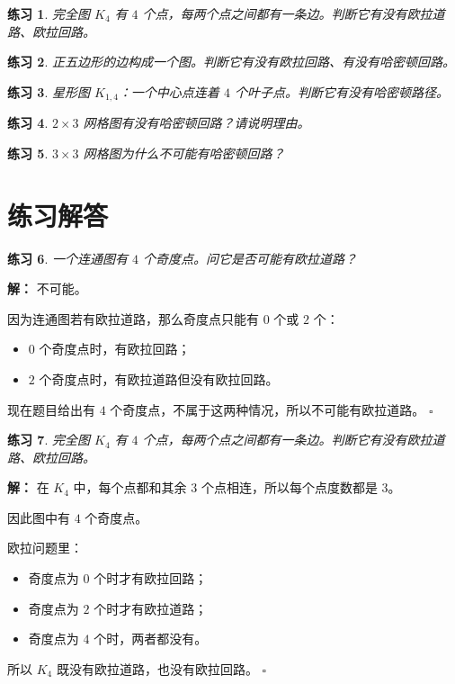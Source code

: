\documentclass[11pt,a4paper,fontset=fandol]{ctexart}
\theoremstyle{formaltheorem}
\theoremstyle{formalexample}
\newtheorem{exercise}{练习}[section]
\newenvironment{solution}{\par\noindent\textbf{解：}}{\hfill$\square$\par}
\begin{document}
\begin{exercise}
完全图 $K_4$ 有 $4$ 个点，每两个点之间都有一条边。判断它有没有欧拉道路、欧拉回路。
\end{exercise}

\begin{exercise}
正五边形的边构成一个图。判断它有没有欧拉回路、有没有哈密顿回路。
\end{exercise}

\begin{exercise}
星形图 $K_{1,4}$：一个中心点连着 $4$ 个叶子点。判断它有没有哈密顿路径。
\end{exercise}

\begin{exercise}
$2\times 3$ 网格图有没有哈密顿回路？请说明理由。
\end{exercise}

\begin{exercise}
$3\times 3$ 网格图为什么不可能有哈密顿回路？
\end{exercise}

\section{练习解答}

\begin{exercise}
一个连通图有 $4$ 个奇度点。问它是否可能有欧拉道路？
\end{exercise}

\begin{solution}
不可能。

因为连通图若有欧拉道路，那么奇度点只能有 $0$ 个或 $2$ 个：
\begin{itemize}
  \item $0$ 个奇度点时，有欧拉回路；
  \item $2$ 个奇度点时，有欧拉道路但没有欧拉回路。
\end{itemize}

现在题目给出有 $4$ 个奇度点，不属于这两种情况，所以不可能有欧拉道路。
\end{solution}

\begin{exercise}
完全图 $K_4$ 有 $4$ 个点，每两个点之间都有一条边。判断它有没有欧拉道路、欧拉回路。
\end{exercise}

\begin{solution}
在 $K_4$ 中，每个点都和其余 $3$ 个点相连，所以每个点度数都是 $3$。

因此图中有 $4$ 个奇度点。

欧拉问题里：
\begin{itemize}
  \item 奇度点为 $0$ 个时才有欧拉回路；
  \item 奇度点为 $2$ 个时才有欧拉道路；
  \item 奇度点为 $4$ 个时，两者都没有。
\end{itemize}

所以 $K_4$ 既没有欧拉道路，也没有欧拉回路。
\end{solution}
\end{document}

